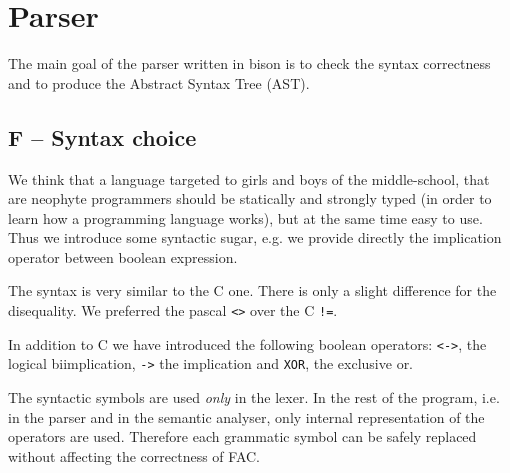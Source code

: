\section{Parser}
\label{sec:parser}
The main goal of the parser written in bison is to check the
syntax correctness and to produce the Abstract Syntax Tree (AST). 

\subsection{F -- Syntax choice}
We think that a language targeted to girls and boys of the middle-school,
that are neophyte programmers should be statically and strongly typed 
(in order to learn how a programming language works), but at the same
time easy to use. Thus we introduce some syntactic sugar, e.g. we 
provide directly the implication operator between boolean expression.

The syntax is very similar to the C one. There is only a slight difference
for the disequality. We preferred the pascal \verb|<>| over the C \verb|!=|. 

In addition to C we have introduced the following
boolean operators: \verb|<->|, the logical biimplication, 
\verb|->| the implication and \verb|XOR|, the exclusive or.

The syntactic symbols are used \emph{only} in the lexer. In the
rest of the program, i.e. in the parser and in the semantic analyser, only
internal representation of the operators are used. Therefore each grammatic
symbol can be safely replaced without affecting the correctness of FAC.



